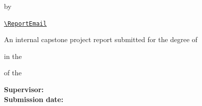 \begin{titlepage}
  \centering
  \vspace*{1.8cm}

  {\Large\bfseries \MakeUppercase{\ReportTitle}\par}

  \vspace{2.3cm}
  {\large by\par}
  \vspace{0.5cm}
  {\Large\bfseries \ReportAuthor\par}
  \vspace{0.25cm}
  {\large \ReportStudentID\par}
  \vspace{0.15cm}
  {\large \href{mailto:\ReportEmail}{\nolinkurl{\ReportEmail}}\par}

  \vfill
  {\large An internal capstone project report submitted for the degree of\par}
  \vspace{0.35cm}
  {\Large\bfseries \ReportDegree\par}
  \vspace{0.35cm}
  {\large in the \ReportDepartment\par}
  \vspace{0.35cm}
  {\large of the \ReportUniversity\par}

  \vfill
  \begin{flushleft}
    \large
    \textbf{Supervisor:} \ReportSupervisor\\[0.5em]
    \textbf{Submission date:} \ReportSubmissionDate
  \end{flushleft}
\end{titlepage}
